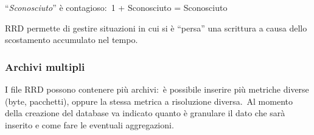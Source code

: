 \begin{center}
    ``\textit{Sconosciuto}'' è contagioso:\  1 + Sconosciuto = Sconosciuto
\end{center}

\noindent RRD permette di gestire situazioni in cui si è ``persa'' una scrittura a causa dello scostamento accumulato nel tempo.\

\subsubsection{Archivi multipli}

I file RRD possono contenere più archivi:\ è possibile inserire più metriche diverse (byte, pacchetti), oppure la stessa metrica a risoluzione diversa.\
Al momento della creazione del database va indicato quanto è granulare il dato che sarà inserito e come fare le eventuali aggregazioni.

